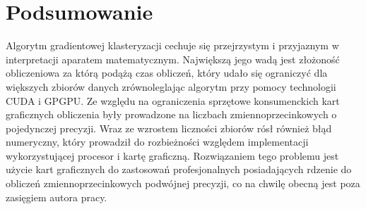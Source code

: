 \chapter{Podsumowanie}
\label{cha:podsumowanie}
Algorytm gradientowej klasteryzacji cechuje się przejrzystym i przyjaznym w interpretacji aparatem matematycznym. Największą jego wadą jest złożoność obliczeniowa za którą podążą czas obliczeń, który udało się ograniczyć dla większych zbiorów danych zrównoleglając algorytm przy pomocy technologii CUDA i GPGPU. Ze względu na ograniczenia sprzętowe konsumenckich kart graficznych obliczenia były prowadzone na liczbach zmiennoprzecinkowych o pojedynczej precyzji. Wraz ze wzrostem liczności zbiorów rósł również błąd numeryczny, który prowadził do rozbieżności względem implementacji wykorzystującej procesor i kartę graficzną. Rozwiązaniem tego problemu jest użycie kart graficznych do zastosowań profesjonalnych posiadających rdzenie do obliczeń zmiennoprzecinkowych podwójnej precyzji, co na chwilę obecną jest poza zasięgiem autora pracy.